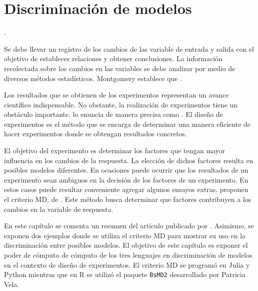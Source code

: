 \chapter{Discriminación de modelos} \label{chapter_MDopt}

 \cite{montgomery2017design}. 

Se debe llevar un registro de los cambios de las variable de entrada y salida con el objetivo de establecer relaciones y obtener conclusiones. La información recolectada sobre los cambios en las variables se debe analizar por medio de diversos métodos estadísticos. Montgomery establece que . 

Los resultados que se obtienen de los experimentos representan un avance científico indispensable. No obstante, la realización de experimentos tiene un obstáculo importante. \cite{box2005statistics} lo enuncia de manera precisa como . El diseño de experimentos es el método que se encarga de determinar una manera eficiente de hacer experimentos donde se obtengan resultados concretos. 

El objetivo del experimento es determinar los factores que tengan mayor influencia en los cambios de la respuesta. La elección de dichos factores resulta en posibles modelos diferentes. En ocasiones puede ocurrir que los resultados de un experimento sean ambiguos en la decisión de los factores de un experimento. En estos casos puede resultar conveniente agregar algunos ensayos extras. \cite{meyer1996} proponen el criterio MD, de . Este método busca determinar que factores contribuyen a los cambios en la variable de respuesta. 

En este capítulo se comenta un resumen del artículo publicado por \cite{meyer1996}. Asimismo, se exponen dos ejemplos donde se utiliza el criterio MD para mostrar su uso en la discriminación entre posibles modelos. El objetivo de este capítulo es exponer el poder de cómputo de cómputo de los tres lenguajes en discriminación de modelos en el contexto de diseño de experimentos. El criterio MD se programó en \textsf{Julia} y \textsf{Python} mientras que en \textsf{R} se utilizó el paquete \texttt{BsMD2} desarrollado por Patricia Vela. 

